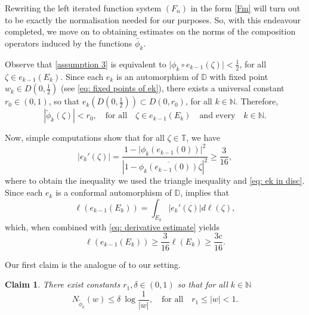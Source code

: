 \documentclass[11pt, reqno]{amsart}
\newtheorem{claim}[theorem]{Claim}
\theoremstyle{definition}
\numberwithin{equation}{section}
\newcommand{\N}{\mathbb{N}}
\newcommand{\D}{\mathbb{D}}
\newcommand{\T}{\mathbb{T}}
\renewcommand{\geq}{\geqslant}
\renewcommand{\leq}{\leqslant}
\begin{document}
Rewriting the left iterated function system $(F_n)$ in the form \eqref{Fm} will turn out to be exactly the normalisation needed for our purposes. So, with this endeavour completed, we move on to obtaining estimates on the norms of the composition operators induced by the functions $\widetilde{\phi_k}$.

Observe that \eqref{assumption 3} is equivalent to $\lvert \phi_k\circ e_{k-1}(\zeta) \rvert <\frac{1}{2}$, for all $\zeta\in e_{k-1}(E_k)$. Since each $e_k$ is an automorphism of $\D$ with fixed point $w_k\in D\left(0,\frac{1}{2}\right)$ (see \eqref{eq: fixed points of ek}), there exists a universal constant $r_0\in(0,1)$, so that $e_k\left(D\left(0,\frac{1}{2}\right)\right)\subset D(0,r_0)$, for all $k\in\N$. Therefore, 
\begin{equation}
\left\lvert\widetilde{\phi}_k(\zeta)\right\rvert<r_0,\quad \text{for all}\quad \zeta\in e_{k-1}(E_k)\quad \text{and every}\quad k\in\N.\label{innerset}
\end{equation}

Now, simple computations show that for all $\zeta\in\T$, we have
\begin{equation}\label{eq: derivative estimate}
\lvert e_k'(\zeta)\rvert = \frac{1-\lvert \phi_k(e_{k-1}(0))\rvert^2}{\left\lvert 1-\overline{\phi_k(e_{k-1}(0))}\zeta\right\rvert^2}\geq \frac{3}{16},
\end{equation}
where to obtain the inequality we used the triangle inequality and \eqref{eq: ek in disc}. Since each $e_k$ is a conformal automorphism of $\D$, \cite[Theorem 6.8]{Po1992} implies that 
\[
\ell(e_{k-1}(E_k))=\int_{E_k}\lvert e_k'(\zeta)\rvert d\ell(\zeta),
\]
which, when combined with \eqref{eq: derivative estimate} yields
\begin{equation}\label{measure}
\ell\left(e_{k-1}(E_k)\right)\geq \frac{3}{16}\ell(E_k)\geq \frac{3c}{16}. 
\end{equation}

Our first claim is the analogue of \cite[Theorem 3.2]{Sh2000} to our setting.

\begin{claim}\label{claim1}
There exist constants $r_1,\delta\in(0,1)$ so that for all $k\in\N$
\[
N_{\widetilde{\phi}_k}(w)\leq \delta\ \log\frac{1}{\lvert w \rvert}, \quad \text{for all} \quad r_1\leq \lvert w \rvert< 1.
\]
\end{claim}
\end{document}
